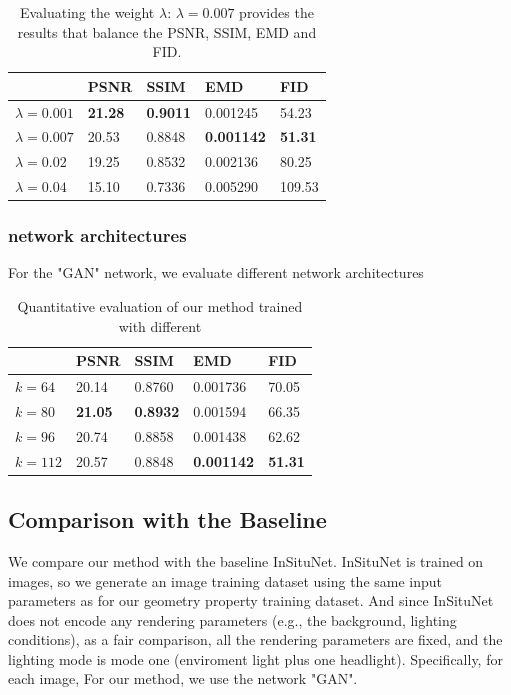 \documentclass[journal]{vgtc}                %
\begin{document}
\begin{table}
\caption{Evaluating the weight $\lambda$: $\lambda=0.007$ provides the results that balance the PSNR, SSIM, EMD and FID. }
    \centering
    \begin{tabular}{l|l|l|l|l}
         & PSNR & SSIM & EMD & FID \\  \hline
         $\lambda=0.001$ & \textbf{21.28} & \textbf{0.9011} & 0.001245 & 54.23
   \\ \hline
         $\lambda=0.007$ & 20.53 & 0.8848 & \textbf{0.001142} & \textbf{51.31}  \\  \hline
         $\lambda=0.02$ & 19.25 & 0.8532 & 0.002136 & 80.25  \\  \hline
         $\lambda=0.04$ & 15.10 & 0.7336 & 0.005290 & 109.53  \\  
    \end{tabular}
    \label{table:lambda}
\end{table}

\subsubsection{network architectures}
For the "GAN" network, we evaluate different network architectures  
\begin{table}
\caption{Quantitative evaluation of our method trained with different  }
    \centering
    \begin{tabular}{l|l|l|l|l}
         & PSNR & SSIM & EMD & FID \\  \hline
         $k=64$ & 20.14 & 0.8760 & 0.001736 & 70.05
   \\ \hline
         $k=80$ & \textbf{21.05} & \textbf{0.8932} & 0.001594 & 66.35  \\  \hline
         $k=96$ & 20.74 & 0.8858 & 0.001438 & 62.62  \\  \hline
         $k=112$ & 20.57 & 0.8848 & \textbf{0.001142} & \textbf{51.31}  \\  
    \end{tabular}
    \label{table:architecture}
\end{table}


\subsection{Comparison with the Baseline}
We compare our method with the baseline InSituNet.  InSituNet is trained on images, so we generate an image training dataset using the same input parameters as for our geometry property training dataset. And since InSituNet does not encode any rendering parameters (e.g., the background, lighting conditions), as a fair comparison, all the rendering parameters are fixed, and the lighting mode is mode one (enviroment light plus one headlight). Specifically, for each image,  For our method, we use the network "GAN". 
\end{document}
